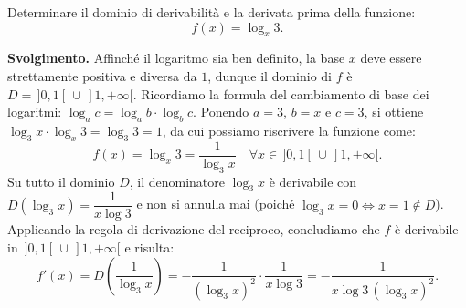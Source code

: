 \begin{esbox}
Determinare il dominio di derivabilità e la derivata prima della funzione:
\[
    f(x) = \log_x 3.
\]

\medskip
\noindent\textbf{Svolgimento.}
Affinché il logaritmo sia ben definito, la base $x$ deve essere strettamente positiva e diversa da $1$, dunque il dominio di $f$ è $D = \,]0, 1[\, \cup \,]1, +\infty[$.
Ricordiamo la formula del cambiamento di base dei logaritmi: $\log_a c = \log_a b \cdot \log_b c$. Ponendo $a = 3$, $b = x$ e $c = 3$, si ottiene $\log_3 x \cdot \log_x 3 = \log_3 3 = 1$, da cui possiamo riscrivere la funzione come:
\[
    f(x) = \log_x 3 = \frac{1}{\log_3 x} \quad \forall x \in \,]0, 1[\, \cup \,]1, +\infty[.
\]
Su tutto il dominio $D$, il denominatore $\log_3 x$ è derivabile con $D(\log_3 x) = \dfrac{1}{x \log 3}$ e non si annulla mai (poiché $\log_3 x = 0 \iff x = 1 \notin D$). Applicando la regola di derivazione del reciproco, concludiamo che $f$ è derivabile in $\,]0, 1[\, \cup \,]1, +\infty[$ e risulta:
\[
    f'(x) = D\!\left(\frac{1}{\log_3 x}\right) = -\frac{1}{(\log_3 x)^2} \cdot \frac{1}{x \log 3} = -\frac{1}{x \log 3 \, (\log_3 x)^2}.
\]
\end{esbox}

